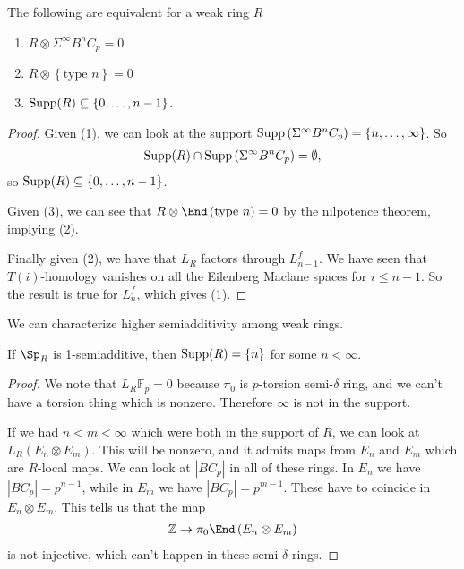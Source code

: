 \begin{proposition} The following are equivalent for a weak ring $R$
\begin{enumerate}
    \item $R \otimes \Sigma^\infty B^n C_p = 0$
    \item $R \otimes \left\{ \text{type } n \right\} = 0$
    \item $\text{Supp}(R) \subseteq \left\{ 0, \ldots, n-1 \right\}$.
\end{enumerate}
\end{proposition}
\begin{proof} Given (1), we can look at the support $\text{Supp} \left( \Sigma^\infty B^n C_p \right) = \left\{ n, \ldots, \infty \right\}$. So
\begin{align*}
    \text{Supp}(R) \cap \text{Supp} \left( \Sigma^\infty B^n C_p \right) = \emptyset,
\end{align*}
so $\text{Supp}(R) \subseteq \left\{ 0, \ldots, n-1 \right\}$.

Given (3), we can see that $R \otimes \End \left( \text{type } n \right) = 0$ by the nilpotence theorem, implying (2).

Finally given (2), we have that $L_R$ factors through $L_{n-1}^f$. We have seen that $T(i)$-homology vanishes on all the Eilenberg Maclane spaces for $i\le n-1$. So the result is true for $L_n^f$, which gives (1).
\end{proof}

We can characterize higher semiadditivity among weak rings.

\begin{proposition} If $\Sp_R$ is 1-semiadditive, then $\text{Supp}(R) = \left\{ n \right\}$ for some $n<\infty$.
\end{proposition}
\begin{proof} We note that $L_R \mathbb{F}_p = 0$ because $\pi_0$ is $p$-torsion semi-$\delta$ ring, and we can't have a torsion thing which is nonzero. Therefore $\infty$ is not in the support.

If we had $n< m < \infty$ which were both in the support of $R$, we can look at $L_R \left( E_n \otimes E_m \right)$. This will be nonzero, and it admits maps from $E_n$ and $E_m$ which are $R$-local maps. We can look at $|BC_p|$ in all of these rings. In $E_n$ we have $|BC_p| = p^{n-1}$, while in $E_m$ we have $|BC_p| = p^{m-1}$. These have to coincide in $E_n \otimes E_m$. This tells us that the map
\begin{align*}
    \mathbb{Z} \to \pi_0 \End \left( E_n \otimes E_m \right)
\end{align*}
is not injective, which can't happen in these semi-$\delta$ rings.
\end{proof}

